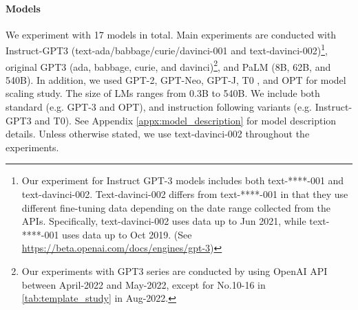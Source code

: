 \documentclass{article}
\newcommand{\mr}[1]{{\color{teal}[{#1} --MR]}}
\begin{document}
\paragraph{Models}
We experiment with 17 models in total. Main experiments are conducted with Instruct-GPT3 \citep{instructgpt} (text-ada/babbage/curie/davinci-001 and text-davinci-002)\footnote{Our experiment for Instruct GPT-3 models includes both text-****-001 and text-davinci-002. Text-davinci-002 differs from text-****-001 in that they use different fine-tuning data depending on the date range collected from the APIs. Specifically, text-davinci-002 uses data up to Jun 2021, while text-****-001 uses data up to Oct 2019. (See \url{https://beta.openai.com/docs/engines/gpt-3})}, original GPT3 \citep{brown2020language} (ada, babbage, curie, and davinci)\footnote{Our experiments with GPT3 series are conducted by using OpenAI API between April-2022 and May-2022, except for No.10-16 in \autoref{tab:template_study} in Aug-2022.}, and PaLM \citep{palm} (8B, 62B, and 540B). 
In addition, we used GPT-2\citep{Radford2019LanguageMA}, GPT-Neo\citep{gpt-neo}, GPT-J\citep{gpt-j}, T0 \citep{sanh2022multitask}, and OPT \citep{zhang2022opt} for model scaling study. 
The size of LMs ranges from 0.3B to 540B. 
We include both standard (e.g. GPT-3 and OPT), and instruction following variants (e.g. Instruct-GPT3 and T0). 
See Appendix \ref{appx:model_description} for model description details.
Unless otherwise stated, we use text-davinci-002 throughout the experiments.
\end{document}
